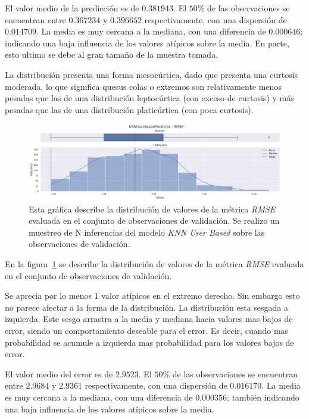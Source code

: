 \documentclass[11pt,a4paper,twoside]{thesis}
\begin{document}
El valor medio de la predicción es de $0.381943$. El $50$\% de las
observaciones se encuentran entre $0.367234$ y $0.396652$ respectivamente, con
una dispersión de $0.014709$. La media es muy cercana a la mediana, con una
diferencia de $0.000646$; indicando una baja influencia de los valores atípicos
sobre la media. En parte, esto ultimo se debe al gran tamaño de la muestra
tomada.

La distribución presenta una forma mesocúrtica, dado que presenta una curtosis
moderada, lo que significa quesus colas o extremos son relativamente menos
pesadas que las de una distribución leptocúrtica (con exceso de curtosis) y más
pesadas que las de una distribución platicúrtica (con poca curtosis).

\begin{figure}[!htb]
	\centering
	\includegraphics[width=15cm]{./images/metrics-knn-user-based-RMSE.png}
	\caption{
		Esta gráfica describe la distribución de valores de la métrica
		\textit{RMSE} evaluada en el conjunto de observaciones de
		validación. Se realizo un muestreo de N inferencias del modelo
		\textit{KNN User Based} sobre las observaciones de validación.
	}
	\label{fig:knnUserRMSE}
\end{figure}

En la figura~\ref{fig:knnUserRMSE} se describe la distribución de valores de la
métrica \textit{RMSE} evaluada en el conjunto de observaciones de validación.

Se aprecia por lo menos $1$ valor atípicos en el extremo derecho. Sin embargo
esto no parece afectar a la forma de la distribución. La distribución esta
sesgada a izquierda. Este sesgo arrastra a la media y mediana hacia valores mas
bajos de error, siendo un comportamiento deseable para el error. Es decir,
cuando mas probabilidad se acumule a izquierda mas probabilidad para los
valores bajos de error.

El valor medio del error es de $2.9523$. El $50$\% de las observaciones se
encuentran entre $2.9684$ y $2.9361$ respectivamente, con una dispersión de
$0.016170$. La media es muy cercana a la mediana, con una diferencia de
$0.000356$; también indicando una baja influencia de los valores atípicos sobre
la media.
\end{document}
